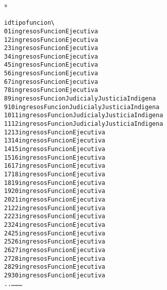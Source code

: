 \documentclass[letterpaper,10pt,english]{/usr/local/lib/python2.7/dist-packages/sphinx/texinputs/sphinxhowto}
\def\smaller{\fontsize{9.5pt}{9.5pt}\selectfont}
\newenvironment{InvisibleVerbatim}
        {\begin{mdframed}[leftmargin=0.1\linewidth,innerleftmargin=3pt,innerrightmargin=3pt, userdefinedwidth=1\linewidth, linewidth=0pt, linecolor=white, usetwoside=false]}
        {\end{mdframed}}
\begin{document}
        

            
                \makebox[0.1\linewidth]{\smaller\hfill\tt\color{nbframe-out-prompt}Out\hspace{4pt}{[}36{]}:\hspace{4pt}}\\*
                \vspace{-2.55\baselineskip}\begin{InvisibleVerbatim}
                \vspace{-0.5\baselineskip}
\begin{alltt}      id      tipo                                   funcion  \textbackslash{}
0      1  ingresos                         Funcion Ejecutiva
1      2  ingresos                         Funcion Ejecutiva
2      3  ingresos                         Funcion Ejecutiva
3      4  ingresos                         Funcion Ejecutiva
4      5  ingresos                         Funcion Ejecutiva
5      6  ingresos                         Funcion Ejecutiva
6      7  ingresos                         Funcion Ejecutiva
7      8  ingresos                         Funcion Ejecutiva
8      9  ingresos      Funcion Judicial y Justicia Indigena
9     10  ingresos      Funcion Judicial y Justicia Indigena
10    11  ingresos      Funcion Judicial y Justicia Indigena
11    12  ingresos      Funcion Judicial y Justicia Indigena
12    13  ingresos                         Funcion Ejecutiva
13    14  ingresos                         Funcion Ejecutiva
14    15  ingresos                         Funcion Ejecutiva
15    16  ingresos                         Funcion Ejecutiva
16    17  ingresos                         Funcion Ejecutiva
17    18  ingresos                         Funcion Ejecutiva
18    19  ingresos                         Funcion Ejecutiva
19    20  ingresos                         Funcion Ejecutiva
20    21  ingresos                         Funcion Ejecutiva
21    22  ingresos                         Funcion Ejecutiva
22    23  ingresos                         Funcion Ejecutiva
23    24  ingresos                         Funcion Ejecutiva
24    25  ingresos                         Funcion Ejecutiva
25    26  ingresos                         Funcion Ejecutiva
26    27  ingresos                         Funcion Ejecutiva
27    28  ingresos                         Funcion Ejecutiva
28    29  ingresos                         Funcion Ejecutiva
29    30  ingresos                         Funcion Ejecutiva
..   \ldots       \ldots                                       \ldots

\end{alltt}
\end{InvisibleVerbatim}
\end{document}
